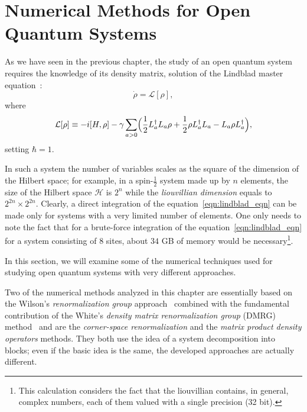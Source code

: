 \chapter{Numerical Methods for Open Quantum Systems}
\label{Chapter2}
As we have seen in the previous chapter, the study of an open quantum system requires the knowledge of its density matrix, solution of the Lindblad master equation~\cite{presk:quant_info}:
\begin{equation*}
    \dot{\rho} = \mathcal{L}[\rho],
\end{equation*}
where
\begin{equation}
\label{eqn:lindblad_eqn}
    \mathcal{L}[\rho] \equiv -i[H, \rho] -\gamma \sum_{a>0}\Bigl(\frac{1}{2}L_a^{\dagger}L_a\rho + \frac{1}{2}\rho L_a^{\dagger}L_a - L_a\rho L_a^{\dagger}\Bigl),
\end{equation}
setting $\hbar = 1$.

In such a system the number of variables scales as the square of the dimension of the Hilbert space; for example, in a spin-$\frac{1}{2}$ system made up by $n$ elements, the size of the Hilbert space $\mathcal{H}$ is $2^n$ while the \emph{liouvillian dimension} equals to $2^{2n} \times 2^{2n}$. Clearly, a direct integration of the equation~\ref{eqn:lindblad_eqn} can be made only for systems with a very limited number of elements. One only needs to note the fact that for a brute-force integration of the equation~\ref{eqn:lindblad_eqn} for a system consisting of $8$ sites, about $34$ GB of memory would be necessary\footnote{This calculation considers the fact that the liouvillian contains, in general, complex numbers, each of them valued with a single precision (32 bit).}.

In this section, we will examine some of the numerical techniques used for studying open quantum systems with very different approaches.

Two of the numerical methods analyzed in this chapter are essentially based on the Wilson's \emph{renormalization group} approach~\cite{RevModPhys.47.773} combined with the fundamental contribution of the White's \emph{density matrix renormalization group} (DMRG) method~\cite{s_white:dmrg} and are the \emph{corner-space renormalization} and the \emph{matrix product density operators} methods. They both use the idea of a system decomposition into blocks; even if the basic idea is the same, the developed approaches are actually different.

